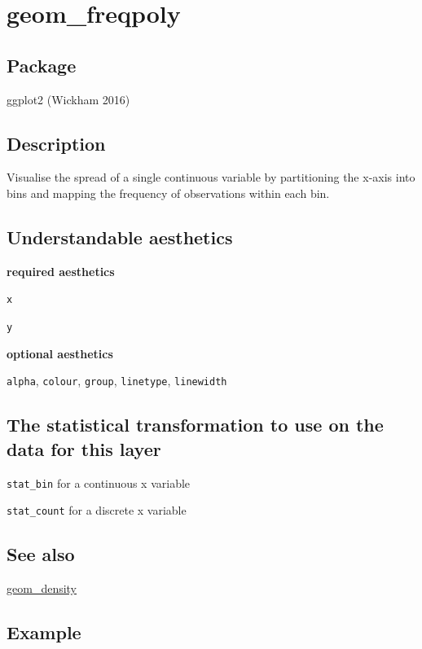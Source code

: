 \documentclass[
  letterpaper,
  DIV=11,
  numbers=noendperiod]{scrreprt}
\begin{document}
\section{geom\_freqpoly}\label{freqpoly}

\subsection{Package}\label{package-5}

ggplot2 (Wickham 2016)

\subsection{Description}\label{description-5}

Visualise the spread of a single continuous variable by partitioning the
x-axis into bins and mapping the frequency of observations within each
bin.

\subsection{Understandable
aesthetics}\label{understandable-aesthetics-6}

\textbf{required aesthetics}

\texttt{x}

\texttt{y}

\textbf{optional aesthetics}

\texttt{alpha}, \texttt{colour}, \texttt{group}, \texttt{linetype},
\texttt{linewidth}

\subsection{The statistical transformation to use on the data for this
layer}\label{the-statistical-transformation-to-use-on-the-data-for-this-layer-5}

\texttt{stat\_bin} for a continuous x variable

\texttt{stat\_count} for a discrete x variable

\subsection{See also}\label{see-also-5}

\hyperref[density]{geom\_density}

\subsection{Example}\label{example-6}
\end{document}
